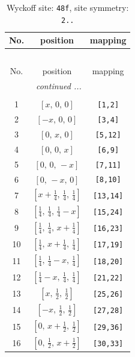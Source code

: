 \documentclass[fleqn,8pt]{jsarticle}
\begin{document}
\begin{longtable}{ccc}
\caption{Wyckoff site: {\tt 48f}, site symmetry: {\tt 2..}}
 \\
 \hline \hline
No. & position & mapping \\ \hline \endfirsthead

\multicolumn{2}{l}{\tablename\ \thetable{}} \\
 \hline \hline
No. & position & mapping \\ \hline \endhead

 \hline \hline
\multicolumn{2}{r}{\footnotesize\it continued ...} \\ \endfoot

 \hline \hline
\multicolumn{2}{r}{} \\ \endlastfoot

1 & $\left[ x,\, 0,\, 0 \right]$ & {\tt [1,2]} \\ \hline
2 & $\left[ - x,\, 0,\, 0 \right]$ & {\tt [3,4]} \\ \hline
3 & $\left[ 0,\, x,\, 0 \right]$ & {\tt [5,12]} \\ \hline
4 & $\left[ 0,\, 0,\, x \right]$ & {\tt [6,9]} \\ \hline
5 & $\left[ 0,\, 0,\, - x \right]$ & {\tt [7,11]} \\ \hline
6 & $\left[ 0,\, - x,\, 0 \right]$ & {\tt [8,10]} \\ \hline
7 & $\left[ x + \frac{1}{4},\, \frac{1}{4},\, \frac{1}{4} \right]$ & {\tt [13,14]} \\ \hline
8 & $\left[ \frac{1}{4},\, \frac{1}{4},\, \frac{1}{4} - x \right]$ & {\tt [15,24]} \\ \hline
9 & $\left[ \frac{1}{4},\, \frac{1}{4},\, x + \frac{1}{4} \right]$ & {\tt [16,23]} \\ \hline
10 & $\left[ \frac{1}{4},\, x + \frac{1}{4},\, \frac{1}{4} \right]$ & {\tt [17,19]} \\ \hline
11 & $\left[ \frac{1}{4},\, \frac{1}{4} - x,\, \frac{1}{4} \right]$ & {\tt [18,20]} \\ \hline
12 & $\left[ \frac{1}{4} - x,\, \frac{1}{4},\, \frac{1}{4} \right]$ & {\tt [21,22]} \\ \hline
13 & $\left[ x,\, \frac{1}{2},\, \frac{1}{2} \right]$ & {\tt [25,26]} \\ \hline
14 & $\left[ - x,\, \frac{1}{2},\, \frac{1}{2} \right]$ & {\tt [27,28]} \\ \hline
15 & $\left[ 0,\, x + \frac{1}{2},\, \frac{1}{2} \right]$ & {\tt [29,36]} \\ \hline
16 & $\left[ 0,\, \frac{1}{2},\, x + \frac{1}{2} \right]$ & {\tt [30,33]} \\ \hline

\end{longtable}
\end{document}
